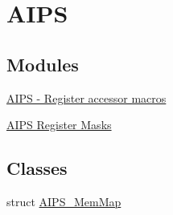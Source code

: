 \hypertarget{group___a_i_p_s___peripheral}{}\section{A\+I\+PS}
\label{group___a_i_p_s___peripheral}
\subsection*{Modules}
\begin{DoxyCompactItemize}
\item 
\hyperlink{group___a_i_p_s___register___accessor___macros}{A\+I\+P\+S -\/ Register accessor macros}
\item 
\hyperlink{group___a_i_p_s___register___masks}{A\+I\+P\+S Register Masks}
\end{DoxyCompactItemize}
\subsection*{Classes}
\begin{DoxyCompactItemize}
\item 
struct \hyperlink{struct_a_i_p_s___mem_map}{A\+I\+P\+S\+\_\+\+Mem\+Map}
\end{DoxyCompactItemize}

